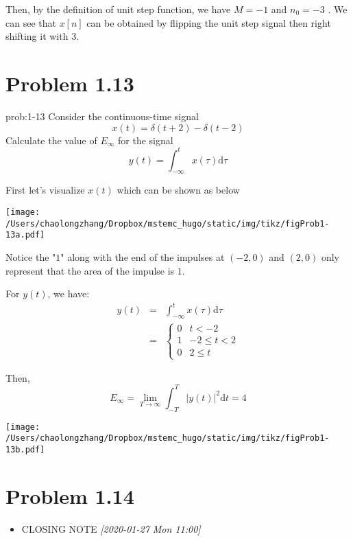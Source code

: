 \documentclass[koma,a4paper,utopia,12pt,listings-color,microtype,paralist,colorlinks,urlcolor=red]{org-article}
\begin{document}
Then, by the definition of unit step function, we have \(M=-1\) and \(n_{0}=
-3\) . We can see that \(x[n]\) can be obtained by flipping the unit step signal
then right shifting it with \(3\).
\section{Problem 1.13}
\label{sec:org6ebc91b}


\begin{prob}[]{prob:1-13}
Consider the continuous-time signal
\begin{equation*}
x(t) = \delta(t+2) - \delta(t-2)
\end{equation*}
Calculate the value of \(E_{\infty}\) for the signal
\begin{equation*}
y(t) = \int_{-\infty}^{t} x(\tau) \mathrm{d} \tau
\end{equation*}
\label{prob:1-13}
\end{prob}


First let's visualize \(x(t)\) which can be shown as below


\begin{center}
\texttt{[image: /Users/chaolongzhang/Dropbox/mstemc\_hugo/static/img/tikz/figProb1-13a.pdf]}
\end{center}


Notice the "\(1\)" along with the end of the impulses at \((-2,0)\) and \((2,0)\)  only
represent that the area of the impulse is \(1\).

For \(y(t)\), we have:
\begin{eqnarray*}
y(t)&=& \int_{-\infty}^{t} x(\tau) \mathrm{d} \tau\\
&=&
\begin{cases}
0 & t < -2 \\
1 & -2 \leq t < 2 \\
0 & 2 \leq t
\end{cases}
\end{eqnarray*}

Then,
\begin{equation*}
E_{\infty} = \lim_{T\to\infty} \int_{-T}^{T} |y(t)|^{2} \mathrm{d}t = 4
\end{equation*}

\begin{center}
\texttt{[image: /Users/chaolongzhang/Dropbox/mstemc\_hugo/static/img/tikz/figProb1-13b.pdf]}
\end{center}
\section{Problem 1.14}
\label{sec:orgaa2c3bc}
\begin{itemize}
\item CLOSING NOTE \textit{[2020-01-27 Mon 11:00]}
\end{itemize}
\end{document}
